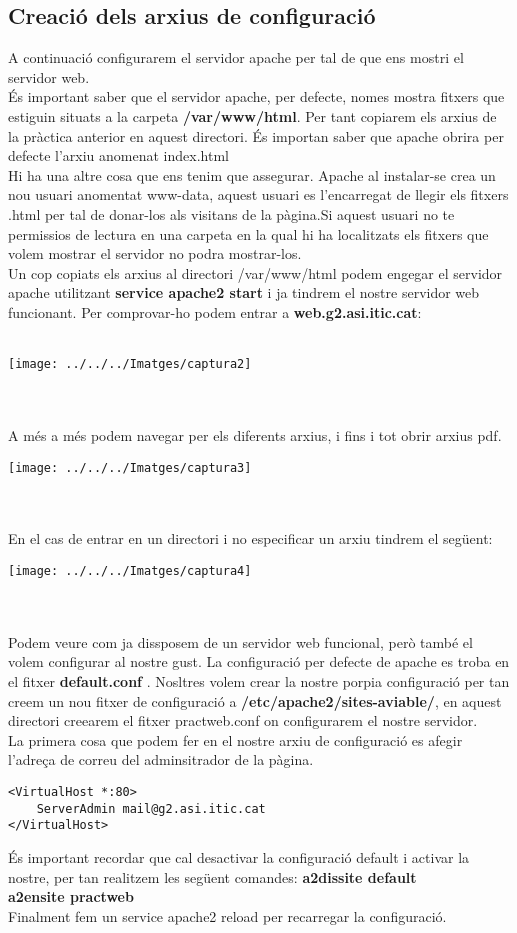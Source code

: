 \documentclass[11p]{article}
\begin{document}
\subsection{Creació dels arxius de configuració}
A continuació configurarem el servidor apache per tal de que ens mostri el servidor web.\\
És important saber que el servidor apache, per defecte, nomes mostra fitxers que estiguin situats a la carpeta \textbf{/var/www/html}. Per tant copiarem els arxius de la pràctica anterior en aquest directori. És importan saber que apache obrira per defecte l'arxiu anomenat index.html \\
Hi ha una altre cosa que ens tenim que assegurar. Apache al instalar-se crea un nou usuari anomentat www-data, aquest usuari es l'encarregat de llegir els fitxers .html per tal de donar-los als visitans de la pàgina.Si aquest usuari no te permissios de lectura en una carpeta en la qual hi ha localitzats els fitxers que volem mostrar el servidor no podra mostrar-los.\\
Un cop copiats els arxius al directori /var/www/html podem engegar el servidor apache utilitzant \textbf{service apache2 start} i ja tindrem el nostre servidor web funcionant. Per comprovar-ho podem entrar a \textbf{web.g2.asi.itic.cat}:\\\\
\centerline{\texttt{[image: ../../../Imatges/captura2]}} \\\\
A més a més podem navegar per els diferents arxius, i fins i tot obrir arxius pdf.\\
\centerline{\texttt{[image: ../../../Imatges/captura3]}}\\\\
En el cas de entrar en un directori i no especificar un arxiu tindrem el següent:\\
\centerline{\texttt{[image: ../../../Imatges/captura4]}}\\\\
Podem veure com ja dissposem de un servidor web funcional, però també el volem configurar al nostre gust. La configuració per defecte de apache es troba en el fitxer \textbf{default.conf} . Nosltres volem crear la nostre porpia configuració per tan creem un nou fitxer de configuració a \textbf{/etc/apache2/sites-aviable/}, en aquest directori creearem el fitxer practweb.conf on configurarem el nostre servidor.\\
La primera cosa que podem fer en el nostre arxiu de configuració es afegir l'adreça de correu del adminsitrador de la pàgina.\\
\begin{lstlisting}
<VirtualHost *:80>
	ServerAdmin mail@g2.asi.itic.cat
</VirtualHost>
\end{lstlisting}
És important recordar que cal desactivar la configuració default i activar la nostre, per tan realitzem les següent comandes:
\textbf{a2dissite default}\\
\textbf{a2ensite practweb}\\
Finalment fem un service apache2 reload per recarregar la configuració.\\
\end{document}
